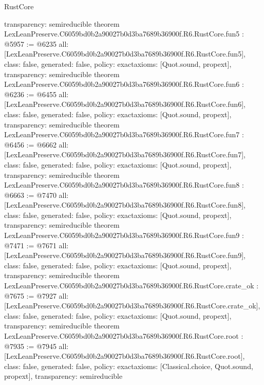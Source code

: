 \begin{lexlean}{RustCore}
\begin{coremodule}
{  transparency: semireducible
}
theorem LexLeanPreserve.C6059bd0b2a90027b0d3ba7689b36900f.R6.RustCore.fun5 : @5957 := @6235 {
  all: [LexLeanPreserve.C6059bd0b2a90027b0d3ba7689b36900f.R6.RustCore.fun5],
  class: false,
  generated: false,
  policy: exact{axioms: [Quot.sound, propext]},
  transparency: semireducible
}
theorem LexLeanPreserve.C6059bd0b2a90027b0d3ba7689b36900f.R6.RustCore.fun6 : @6236 := @6455 {
  all: [LexLeanPreserve.C6059bd0b2a90027b0d3ba7689b36900f.R6.RustCore.fun6],
  class: false,
  generated: false,
  policy: exact{axioms: [Quot.sound, propext]},
  transparency: semireducible
}
theorem LexLeanPreserve.C6059bd0b2a90027b0d3ba7689b36900f.R6.RustCore.fun7 : @6456 := @6662 {
  all: [LexLeanPreserve.C6059bd0b2a90027b0d3ba7689b36900f.R6.RustCore.fun7],
  class: false,
  generated: false,
  policy: exact{axioms: [Quot.sound, propext]},
  transparency: semireducible
}
theorem LexLeanPreserve.C6059bd0b2a90027b0d3ba7689b36900f.R6.RustCore.fun8 : @6663 := @7470 {
  all: [LexLeanPreserve.C6059bd0b2a90027b0d3ba7689b36900f.R6.RustCore.fun8],
  class: false,
  generated: false,
  policy: exact{axioms: [Quot.sound, propext]},
  transparency: semireducible
}
theorem LexLeanPreserve.C6059bd0b2a90027b0d3ba7689b36900f.R6.RustCore.fun9 : @7471 := @7671 {
  all: [LexLeanPreserve.C6059bd0b2a90027b0d3ba7689b36900f.R6.RustCore.fun9],
  class: false,
  generated: false,
  policy: exact{axioms: [Quot.sound, propext]},
  transparency: semireducible
}
theorem LexLeanPreserve.C6059bd0b2a90027b0d3ba7689b36900f.R6.RustCore.crate_ok : @7675 := @7927 {
  all: [LexLeanPreserve.C6059bd0b2a90027b0d3ba7689b36900f.R6.RustCore.crate_ok],
  class: false,
  generated: false,
  policy: exact{axioms: [Quot.sound, propext]},
  transparency: semireducible
}
theorem LexLeanPreserve.C6059bd0b2a90027b0d3ba7689b36900f.R6.RustCore.root : @7935 := @7945 {
  all: [LexLeanPreserve.C6059bd0b2a90027b0d3ba7689b36900f.R6.RustCore.root],
  class: false,
  generated: false,
  policy: exact{axioms: [Classical.choice, Quot.sound, propext]},
  transparency: semireducible
}


\end{coremodule}
\end{lexlean}
